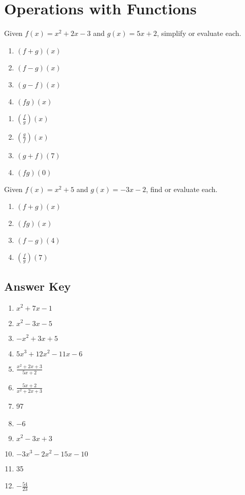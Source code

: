 \chapter{Operations with Functions}

Given $f(x)=x^2 + 2x - 3$ and $g(x) = 5x+2$, simplify or evaluate each.

\begin{multicols}{4}
\begin{enumerate}
	\item $(f+g)(x)$
	\item $(f-g)(x) $
	\item $(g-f)(x)$
	\item $(fg)(x)$
\end{enumerate}	\setcounter{Review}{\value{enumi}}
\end{multicols}
\begin{multicols}{4}
\begin{enumerate}	\setcounter{enumi}{\value{Review}}
	\item $\left(\frac{f}{g}\right)(x)$
	\item $\left(\frac{g}{f}\right)(x) $
	\item $(g+f)(7)$
	\item $(fg)(0)$
\end{enumerate}	\setcounter{Review}{\value{enumi}}
\end{multicols}

Given $f(x) = x^2 + 5$ and $g(x) = -3x-2$, find or evaluate each.
\begin{multicols}{4}
\begin{enumerate}	\setcounter{enumi}{\value{Review}}
	\item $(f + g)(x)$
	\item $(fg)(x)$
	\item $(f-g)(4)$
	\item $\left(\frac{f}{g}\right)(7)$
\end{enumerate}	\setcounter{Review}{\value{enumi}}
\end{multicols}

\newpage

\section{Answer Key}

\begin{enumerate}
	\item $x^2+7x-1$
    \item $x^2-3x-5$
    \item $-x^2+3x+5$
    \item $5x^3+12x^2-11x-6$
    \item $\frac{x^2+2x+3}{5x+2}$
    \item $\frac{5x+2}{x^2+2x+3}$
    \item 97
    \item $-6$
    \item $x^2-3x+3$
    \item $-3x^3-2x^2-15x-10$
    \item 35
    \item $-\frac{54}{23}$
\end{enumerate}